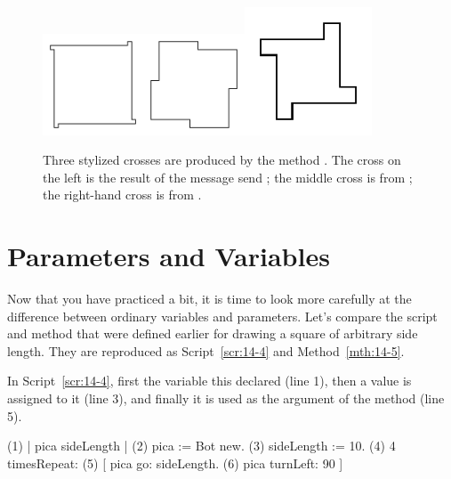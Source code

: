 \documentclass[a4paper,10pt,twoside]{book}
\begin{document}
\begin{figure}
\includegraphics[width=3cm]{Argcrossscr2.pdf}\hfill\includegraphics[width=3cm]{Argcrossscr3}\hfill\includegraphics[width=3.8cm]{Argcrossscr4}
\caption{Three stylized crosses are produced by the method . The cross on 
the left is the result of the message send ; the middle cross is from 
; the right-hand cross is from . \label{crosses}}
\end{figure}

\section{Parameters and Variables }

Now that you have practiced a bit, it is time to look more carefully at the difference between 
ordinary variables and parameters. Let’s compare the script and method that were defined 
earlier for drawing a square of arbitrary side length. They are reproduced as Script~\ref{scr:14-4} and 
Method~\ref{mth:14-5}. 

In Script~\ref{scr:14-4}, first the variable  this declared (line 1), then a value is assigned to 
it (line 3), and finally it is used as the argument of the method  (line 5). 

\begin{script}[14-4]{}
(1)  | pica sideLength | 
(2)  pica := Bot new. 
(3)  sideLength := 10. 
(4)  4 timesRepeat: 
(5)       [ pica go: sideLength. 
(6)       pica turnLeft: 90 ] 
\end{script}
\end{document}
